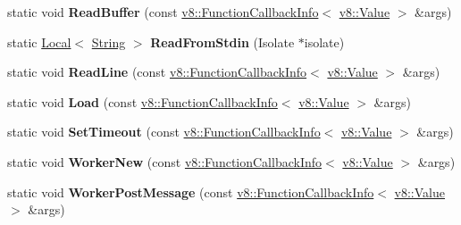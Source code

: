 \begin{DoxyCompactItemize}
\mbox{\label{classv8_1_1Shell_a35d2c0d84ddc58b9b51745d47d9acc25}} 
static void {\bfseries Read\+Buffer} (const \mbox{\hyperlink{classv8_1_1FunctionCallbackInfo}{v8\+::\+Function\+Callback\+Info}}$<$ \mbox{\hyperlink{classv8_1_1Value}{v8\+::\+Value}} $>$ \&args)
\item 
\mbox{\label{classv8_1_1Shell_afc4ac604ee375a1effbf9d8e55423db1}} 
static \mbox{\hyperlink{classv8_1_1Local}{Local}}$<$ \mbox{\hyperlink{classv8_1_1String}{String}} $>$ {\bfseries Read\+From\+Stdin} (Isolate $\ast$isolate)
\item 
\mbox{\label{classv8_1_1Shell_a3f3a76857a48f6e107fe63bcc829396f}} 
static void {\bfseries Read\+Line} (const \mbox{\hyperlink{classv8_1_1FunctionCallbackInfo}{v8\+::\+Function\+Callback\+Info}}$<$ \mbox{\hyperlink{classv8_1_1Value}{v8\+::\+Value}} $>$ \&args)
\item 
\mbox{\label{classv8_1_1Shell_ab4fe0c5dd861c5d36733e2116c793155}} 
static void {\bfseries Load} (const \mbox{\hyperlink{classv8_1_1FunctionCallbackInfo}{v8\+::\+Function\+Callback\+Info}}$<$ \mbox{\hyperlink{classv8_1_1Value}{v8\+::\+Value}} $>$ \&args)
\item 
\mbox{\label{classv8_1_1Shell_af6b815331bf4ed64e58a8eb5d9153eda}} 
static void {\bfseries Set\+Timeout} (const \mbox{\hyperlink{classv8_1_1FunctionCallbackInfo}{v8\+::\+Function\+Callback\+Info}}$<$ \mbox{\hyperlink{classv8_1_1Value}{v8\+::\+Value}} $>$ \&args)
\item 
\mbox{\label{classv8_1_1Shell_a00ba91a1f9369a559118c0484db90009}} 
static void {\bfseries Worker\+New} (const \mbox{\hyperlink{classv8_1_1FunctionCallbackInfo}{v8\+::\+Function\+Callback\+Info}}$<$ \mbox{\hyperlink{classv8_1_1Value}{v8\+::\+Value}} $>$ \&args)
\item 
\mbox{\label{classv8_1_1Shell_a0864855c72409f26946bd551f1a36e72}} 
static void {\bfseries Worker\+Post\+Message} (const \mbox{\hyperlink{classv8_1_1FunctionCallbackInfo}{v8\+::\+Function\+Callback\+Info}}$<$ \mbox{\hyperlink{classv8_1_1Value}{v8\+::\+Value}} $>$ \&args)
\item 
\mbox{\label{classv8_1_1Shell_ac9721473f8f8523b578096bf7f139016}} 

\end{DoxyCompactItemize}
